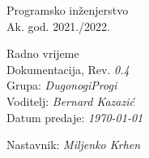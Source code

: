 \documentclass[12pt]{report}
\begin{document}
 
		
		
		
		\begin{titlepage}
			\begin{center}
				\LARGE Programsko inženjerstvo\\
				\large Ak. god. 2021./2022.\\
				
				
				\huge Radno vrijeme\\
				\Large Dokumentacija, Rev. \textit{0.4}\\
				
				\normalsize
				Grupa: \textit{DugonogiProgi}\\
				Voditelj: \textit{Bernard Kazazić}\\
				
				
				Datum predaje: \textit{\today}\\
				
				
				Nastavnik: \textit{Miljenko Krhen}\\
				
			\end{center}
			
			
		\end{titlepage}
		
		
		\tableofcontents
		
		
		
		
		
		
		
		
		
		
		\begingroup
		\renewcommand*\listfigurename{Indeks slika i dijagrama}
		\listoffigures
		\endgroup
		
		
		
		\eject 
		
		
		
		
	
\end{document}
